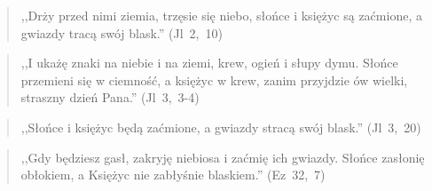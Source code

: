 \documentclass[10pt,a4paper,oneside]{article}
\begin{document}
\begin{quote}
,,Drży przed nimi ziemia, trzęsie się niebo, słońce i księżyc są zaćmione, a gwiazdy tracą swój blask.'' (Jl~2,~10)
\end{quote}
\begin{quote}
,,I ukażę znaki na niebie i na ziemi, krew, ogień i słupy dymu. Słońce przemieni się w ciemność, a księżyc w krew, zanim przyjdzie ów wielki, straszny dzień Pana.'' (Jl~3,~3-4)
\end{quote}
\begin{quote}
,,Słońce i księżyc będą zaćmione, a gwiazdy stracą swój blask.'' (Jl~3,~20)
\end{quote}
\begin{quote}
,,Gdy będziesz gasł, zakryję niebiosa i zaćmię ich gwiazdy. Słońce zasłonię obłokiem, a Księżyc nie zabłyśnie blaskiem.'' (Ez~32,~7)
\end{quote}
\end{document}
